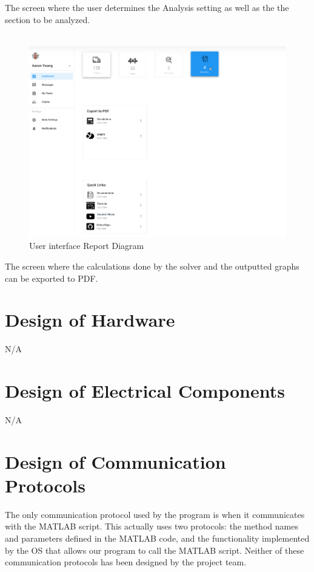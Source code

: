 \documentclass[12pt, titlepage]{article}
\begin{document}
The screen where the user determines the Analysis setting as well as the the section to be analyzed.\\\\
\begin{figure}[H]
  \includegraphics[]{../images/Userinterface-Report.PNG}
  \caption{User interface Report Diagram}
  \label{fig:userinterface-report-diagram}
\end{figure}
The screen where the calculations done by the solver and the outputted graphs can be exported to PDF.

\section{Design of Hardware}
N/A

\section{Design of Electrical Components}
N/A

\section{Design of Communication Protocols}

The only communication protocol used by the program is when it communicates with the MATLAB script. This actually uses two protocols: the method names and parameters defined in the MATLAB code, and the functionality implemented by the OS that allows our program to call the MATLAB script. Neither of these communication protocols has been designed by the project team.
\end{document}

